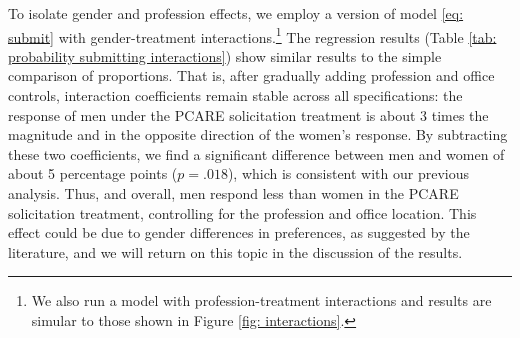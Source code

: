 \documentclass[12pt, titlepage]{article}
\begin{document}
To isolate gender and profession effects, we employ a version of model
\eqref{eq: submit} with gender-treatment interactions.\footnote{We also
  run a model with profession-treatment interactions and results are
  simular to those shown in Figure \ref{fig: interactions}.} The
regression results (Table
\ref{tab: probability submitting interactions}) show similar results to
the simple comparison of proportions. That is, after gradually adding
profession and office controls, interaction coefficients remain stable
across all specifications: the response of men under the PCARE
solicitation treatment is about 3 times the magnitude and in the
opposite direction of the women's response. By subtracting these two
coefficients, we find a significant difference between men and women of
about 5 percentage points (\(p=.018\)), which is consistent with our
previous analysis. Thus, and overall, men respond less than women in the
PCARE solicitation treatment, controlling for the profession and office
location. This effect could be due to gender differences in preferences,
as suggested by the literature, and we will return on this topic in the
discussion of the results.
\end{document}
